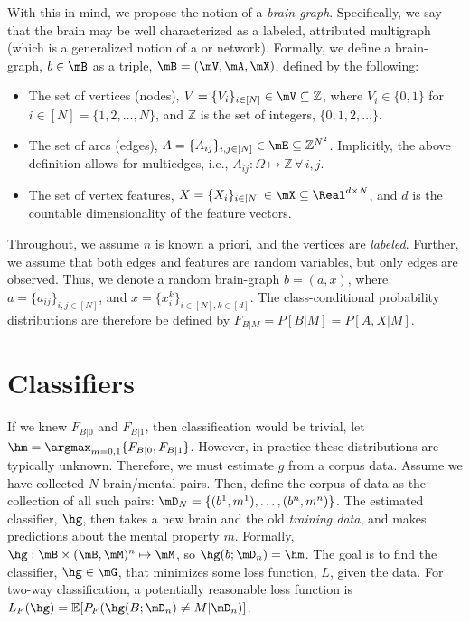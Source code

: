 \documentclass{article}
\begin{document}
With this in mind, we propose the notion of a \emph{brain-graph}. Specifically, we say that the brain may be well characterized as a labeled, attributed multigraph (which is a generalized notion of a or network). Formally, we define a brain-graph, $b\in \mB$ as a triple, $\mB=(\mV,\mA,\mX)$, defined by the following:
\begin{itemize}
	\item The set of vertices (nodes), $V=\{V_i\}_{i\in[N]} \in \mV \subseteq \mathbb{Z}$, where $V_i \in \{0,1\}$ for $i \in [N]=\{1,2,\ldots,N\}$, and  $\mathbb{Z}$ is the set of integers, $\{0,1,2,\ldots\}$.  
	\item The set of arcs (edges), $A=\{A_{ij}\}_{i,j \in [N]} \in \mE \subseteq \mathbb{Z}^{N^2}$. Implicitly, the above definition allows for multiedges, i.e.,  $A_{ij}: \Omega \mapsto \mathbb{Z}\, \forall \, i,j$. 
	\item The set of vertex features, $X=\{X_i\}_{i\in[N]} \in \mX \subseteq \Real^{d \times N}$, and $d$ is the countable dimensionality of the feature vectors. 
\end{itemize}

Throughout, we assume $n$ is known a priori, and the vertices are \emph{labeled}.  Further, we assume that both edges and features are random variables, but only edges are observed.  Thus, we denote a random brain-graph $b=(a,x)$, where $a=\{a_{ij}\}_{i,j \in [N]}$, and $x=\{x_i^k\}_{i\in[N], k \in [d]}$.  The class-conditional probability distributions are therefore be defined by $F_{B|M}=P[B | M]=P[A,X|M]$.  







\section{Classifiers} %
\label{sec:classifiers}

If we knew $F_{B|0}$ and $F_{B|1}$, then classification would be trivial, let $\hm=\argmax_{m=0,1} \{F_{B|0}, F_{B|1}\}$.   However, in practice these distributions are typically unknown. Therefore, we must estimate $g$ from a corpus data. Assume we have collected $N$ brain/mental pairs. Then, define the corpus of data as the collection of all such pairs: $\mD_{N}=\{(b^1,m^1), \ldots, (b^n,m^n)\}$. The estimated classifier, $\hg$, then takes a new brain and the old \emph{training data}, and makes predictions about the mental property $m$. Formally, $\hg: \mB \times (\mB, \mM)^n \mapsto \mM$, so $\hg(b; \mD_n)=\hm$.  The goal is to find the classifier, $\hg \in \mG$, that minimizes some loss function, $L$, given the data.  For two-way classification, a potentially reasonable loss function is $L_F(\hg)=\mathbb{E}[P_F(\hg(B;\mD_n) \neq M | \mD_n)]$.  
\end{document}
